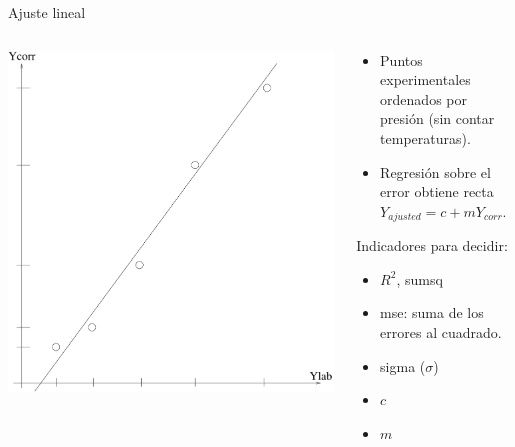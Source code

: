 \documentclass{beamer}
\begin{document}
\begin{frame}{Ajuste lineal}
 
 \begin{columns}
  \begin{column}{5cm}
   \includegraphics[scale=.25]{tuining}
  \end{column}
  \begin{column}{5cm}
   \begin{itemize}
    \item  Puntos experimentales ordenados por presión (sin
	  contar temperaturas).
    \item Regresión sobre el error obtiene recta    $Y_{ajusted} = c + m Y_{corr}$.

   \end{itemize}
      
   Indicadores para decidir:
    \begin{itemize}
     \item $R^2$, sumsq
     \item mse: suma de los errores al cuadrado.
     \item sigma ($\sigma$)
     \item $c$
     \item $m$
    \end{itemize}
  \end{column}
 \end{columns}
\end{frame}
\end{document}

